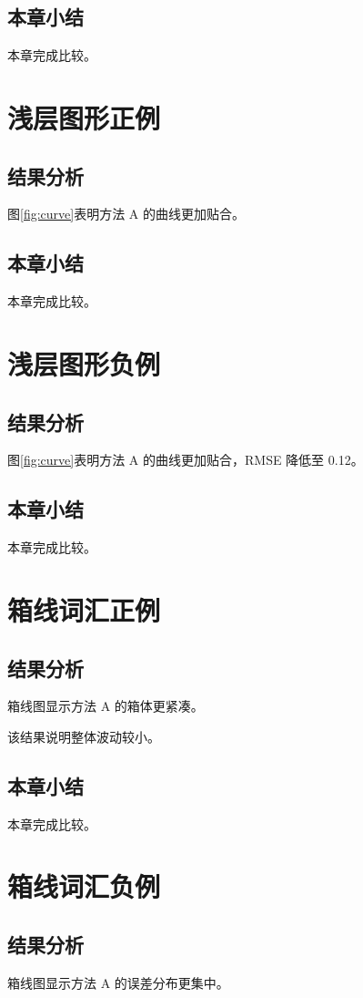 \section{本章小结}
本章完成比较。

\chapter{浅层图形正例}
\section{结果分析}
图\ref{fig:curve}表明方法 A 的曲线更加贴合。
\section{本章小结}
本章完成比较。

\chapter{浅层图形负例}
\section{结果分析}
图\ref{fig:curve}表明方法 A 的曲线更加贴合，RMSE 降低至 0.12。
\section{本章小结}
本章完成比较。

\chapter{箱线词汇正例}
\section{结果分析}
箱线图显示方法 A 的箱体更紧凑。

该结果说明整体波动较小。
\section{本章小结}
本章完成比较。

\chapter{箱线词汇负例}
\section{结果分析}
箱线图显示方法 A 的误差分布更集中。

